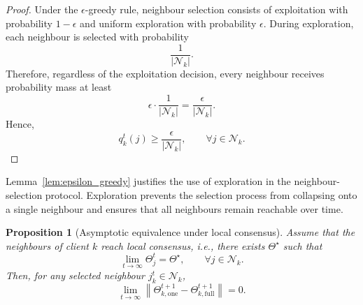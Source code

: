 \documentclass[conference]{IEEEtran}
\newtheorem{proposition}{Proposition}
\begin{document}
\begin{proof}
Under the $\epsilon$-greedy rule, neighbour selection consists of exploitation with probability $1-\epsilon$ and uniform exploration with probability $\epsilon$. During exploration, each neighbour is selected with probability
\begin{equation}
\frac{1}{|\mathcal{N}_k|}.
    \label{eq:auto-064}
\end{equation}
Therefore, regardless of the exploitation decision, every neighbour receives probability mass at least
\begin{equation}
\epsilon \cdot \frac{1}{|\mathcal{N}_k|}
=
\frac{\epsilon}{|\mathcal{N}_k|}.
    \label{eq:auto-065}
\end{equation}
Hence,
\begin{equation}
q_k^t(j)
\geq
\frac{\epsilon}{|\mathcal{N}_k|},
\qquad
\forall j\in\mathcal{N}_k.
    \label{eq:auto-066}
\end{equation}
\end{proof}

Lemma~\ref{lem:epsilon_greedy} justifies the use of exploration in the neighbour-selection protocol. Exploration prevents the selection process from collapsing onto a single neighbour and ensures that all neighbours remain reachable over time.

\begin{proposition}[Asymptotic equivalence under local consensus]
\label{prop:asymptotic_equivalence}
Assume that the neighbours of client $k$ reach local consensus, i.e., there exists $\Theta^\star$ such that
\begin{equation}
\lim_{t\rightarrow\infty}
\Theta_j^t
=
\Theta^\star,
\qquad
\forall j\in\mathcal{N}_k.
    \label{eq:auto-067}
\end{equation}
Then, for any selected neighbour $j_k^t\in\mathcal{N}_k$,
\begin{equation}
\lim_{t\rightarrow\infty}
\left\|
\Theta_{k,\mathrm{one}}^{t+1}
-
\Theta_{k,\mathrm{full}}^{t+1}
\right\|
=
0.
    \label{eq:auto-068}
\end{equation}
\end{proposition}
\end{document}
